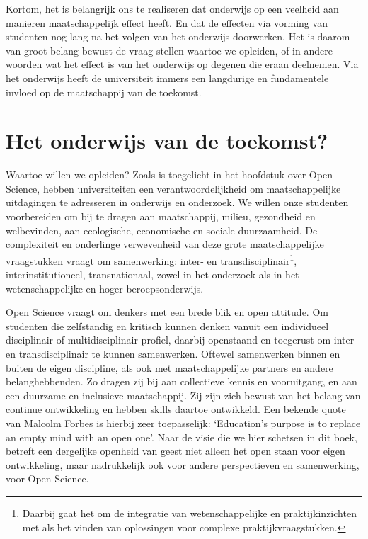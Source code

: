 \documentclass[empirical, authordate, ]{new-jote-article}
\begin{document}
	Kortom, het is belangrijk ons te realiseren dat onderwijs op een veelheid aan manieren maatschappelijk effect heeft. En dat de effecten via vorming van studenten nog lang na het volgen van het onderwijs doorwerken. Het is daarom van groot belang bewust de vraag stellen waartoe we opleiden, of in andere woorden wat het effect is van het onderwijs op degenen die eraan deelnemen. Via het onderwijs heeft de universiteit immers een langdurige en fundamentele invloed op de maatschappij van de toekomst.



	\section{Het onderwijs van de toekomst?}



	Waartoe willen we opleiden? Zoals is toegelicht in het hoofdstuk over Open Science, hebben universiteiten een verantwoordelijkheid om maatschappelijke uitdagingen te adresseren in onderwijs en onderzoek. We willen onze studenten voorbereiden om bij te dragen aan maatschappij, milieu, gezondheid en welbevinden, aan ecologische, economische en sociale duurzaamheid. De complexiteit en onderlinge verwevenheid van deze grote maatschappelijke vraagstukken vraagt om samenwerking: inter- en transdisciplinair\footnote{Daarbij gaat het om de integratie van wetenschappelijke en praktijkinzichten met als het vinden van oplossingen voor complexe praktijkvraagstukken.}, interinstitutioneel, transnationaal, zowel in het onderzoek als in het wetenschappelijke en hoger beroepsonderwijs.



	Open Science vraagt om denkers met een brede blik en open attitude. Om studenten die zelfstandig en kritisch kunnen denken vanuit een individueel disciplinair of multidisciplinair profiel, daarbij openstaand en toegerust om inter- en transdisciplinair te kunnen samenwerken. Oftewel samenwerken binnen en buiten de eigen discipline, als ook met maatschappelijke partners en andere belanghebbenden. Zo dragen zij bij aan collectieve kennis en vooruitgang, en aan een duurzame en inclusieve maatschappij. Zij zijn zich bewust van het belang van continue ontwikkeling en hebben skills daartoe ontwikkeld. Een bekende quote van Malcolm Forbes is hierbij zeer toepasselijk: ‘Education's purpose is to replace an empty mind with an open one'. Naar de visie die we hier schetsen in dit boek, betreft een dergelijke openheid van geest niet alleen het open staan voor eigen ontwikkeling, maar nadrukkelijk ook voor andere perspectieven en samenwerking, voor Open Science.
\end{document}
